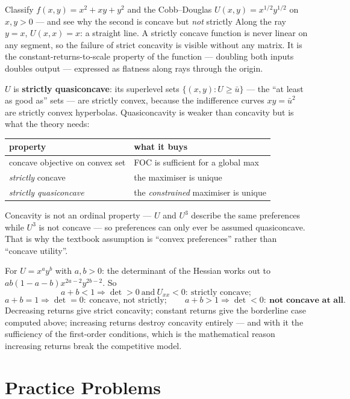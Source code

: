 \begin{worked}{Classify $f(x,y)=x^{2}+xy+y^{2}$ and the Cobb--Douglas $U(x,y)=x^{1/2}y^{1/2}$ on $x,y>0$ --- and see why the second is concave but \emph{not} strictly}
Along the ray $y=x$, $U(x,x)=x$: a straight line. A strictly concave
function is never linear on any segment, so the failure of strict concavity
is visible without any matrix. It is the constant-returns-to-scale property
of the function --- doubling both inputs doubles output --- expressed as
flatness along rays through the origin.

$U$ is \textbf{strictly quasiconcave}: its superlevel sets
$\{(x,y):U\ge\bar u\}$ --- the ``at least as good as'' sets --- are strictly
convex, because the indifference curves $xy=\bar u^{2}$ are strictly convex
hyperbolas. Quasiconcavity is weaker than concavity but is what the theory
needs:
\begin{center}\footnotesize
\begin{tabular}{ll}
  \hline
  property & what it buys\\
  \hline
  concave objective on convex set & FOC is sufficient for a global max\\
  \emph{strictly} concave & the maximiser is unique\\
  \emph{strictly quasiconcave} & the \emph{constrained} maximiser is unique\\
  \hline
\end{tabular}
\end{center}
Concavity is not an ordinal property --- $U$ and $U^{3}$ describe the same
preferences while $U^{3}$ is not concave --- so preferences can only ever be
assumed quasiconcave. That is why the textbook assumption is ``convex
preferences'' rather than ``concave utility''.

For $U=x^{a}y^{b}$ with $a,b>0$: the determinant of the Hessian works out
to $ab(1-a-b)x^{2a-2}y^{2b-2}$. So
\[
  a+b<1\Rightarrow\det>0\ \text{and}\ U_{xx}<0:\ \text{strictly concave};
\]
\[
  a+b=1\Rightarrow\det=0:\ \text{concave, not strictly};
  \qquad
  a+b>1\Rightarrow\det<0:\ \textbf{not concave at all.}
\]
Decreasing returns give strict concavity; constant returns give the
borderline case computed above; increasing returns destroy concavity
entirely --- and with it the sufficiency of the first-order conditions,
which is the mathematical reason increasing returns break the competitive
model.
\end{worked}

\section{Practice Problems}

